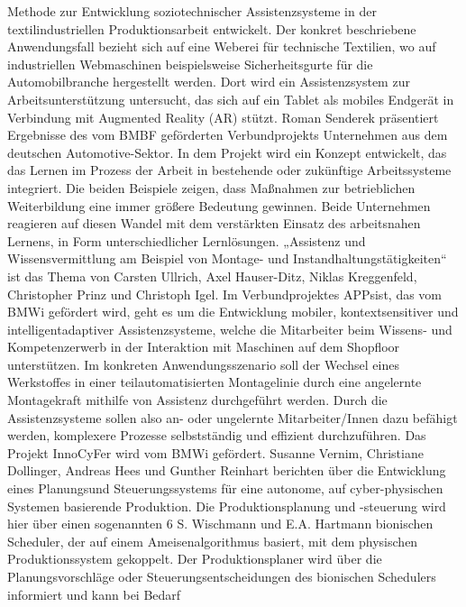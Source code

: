 Methode zur Entwicklung soziotechnischer Assistenzsysteme in der textilindustriellen
Produktionsarbeit entwickelt. Der konkret beschriebene Anwendungsfall bezieht sich auf
eine Weberei für technische Textilien, wo auf industriellen Webmaschinen beispielsweise
Sicherheitsgurte für die Automobilbranche hergestellt werden. Dort wird ein Assistenzsystem zur Arbeitsunterstützung untersucht, das sich auf ein Tablet als mobiles Endgerät
in Verbindung mit Augmented Reality (AR) stützt.
Roman Senderek präsentiert Ergebnisse des vom BMBF geförderten Verbundprojekts
Unternehmen aus dem deutschen Automotive-Sektor. In dem Projekt wird ein Konzept
entwickelt, das das Lernen im Prozess der Arbeit in bestehende oder zukünftige Arbeitssysteme integriert. Die beiden Beispiele zeigen, dass Maßnahmen zur betrieblichen Weiterbildung eine immer größere Bedeutung gewinnen. Beide Unternehmen reagieren auf
diesen Wandel mit dem verstärkten Einsatz des arbeitsnahen Lernens, in Form unterschiedlicher Lernlösungen.
„Assistenz und Wissensvermittlung am Beispiel von Montage- und Instandhaltungstätigkeiten“ ist das Thema von Carsten Ullrich, Axel Hauser-Ditz, Niklas Kreggenfeld,
Christopher Prinz und Christoph Igel. Im Verbundprojektes APPsist, das vom BMWi
gefördert wird, geht es um die Entwicklung mobiler, kontextsensitiver und intelligentadaptiver Assistenzsysteme, welche die Mitarbeiter beim Wissens- und Kompetenzerwerb
in der Interaktion mit Maschinen auf dem Shopfloor unterstützen. Im konkreten Anwendungsszenario soll der Wechsel eines Werkstoffes in einer teilautomatisierten Montagelinie durch eine angelernte Montagekraft mithilfe von Assistenz durchgeführt werden.
Durch die Assistenzsysteme sollen also an- oder ungelernte Mitarbeiter/Innen dazu befähigt werden, komplexere Prozesse selbstständig und effizient durchzuführen.
Das Projekt InnoCyFer wird vom BMWi gefördert. Susanne Vernim, Christiane Dollinger, Andreas Hees und Gunther Reinhart berichten über die Entwicklung eines Planungsund Steuerungssystems für eine autonome, auf cyber-physischen Systemen basierende
Produktion. Die Produktionsplanung und -steuerung wird hier über einen sogenannten 
6 S. Wischmann und E.A. Hartmann
bionischen Scheduler, der auf einem Ameisenalgorithmus basiert, mit dem physischen
Produktionssystem gekoppelt. Der Produktionsplaner wird über die Planungsvorschläge
oder Steuerungsentscheidungen des bionischen Schedulers informiert und kann bei Bedarf
